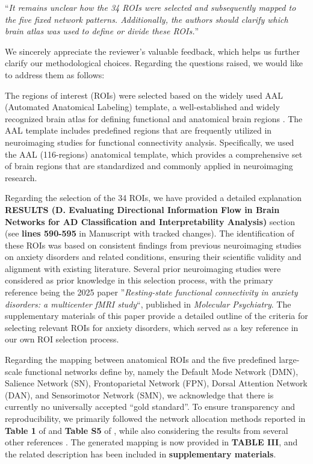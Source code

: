 \documentclass[lettersize,journal]{IEEEtran}
\begin{document}
 ``{\it It remains unclear how the 34 ROIs were selected and subsequently mapped to the five fixed network patterns. Additionally, the authors should clarify which brain atlas was used to define or divide these ROIs.}''
\vspace{1mm}


We sincerely appreciate the reviewer’s valuable feedback, which helps us further clarify our methodological choices. Regarding the questions raised, we would like to address them as follows:

The regions of interest (ROIs) were selected based on the widely used AAL (Automated Anatomical Labeling) template, a well-established and widely recognized brain atlas for defining functional and anatomical brain regions \cite{tzourio2002automated}. The AAL template includes predefined regions that are frequently utilized in neuroimaging studies for functional connectivity analysis. Specifically, we used the AAL (116-regions) anatomical template, which provides a comprehensive set of brain regions that are standardized and commonly applied in neuroimaging research.

Regarding the selection of the 34 ROIs, we have provided a detailed explanation \textbf{RESULTS (D. Evaluating Directional Information Flow in Brain Networks for AD Classification and Interpretability Analysis)} section (see \textbf{lines 590-595} in Manuscript with tracked changes). The identification of these ROIs was based on consistent findings from previous neuroimaging studies on anxiety disorders and related conditions, ensuring their scientific validity and alignment with existing literature. Several prior neuroimaging studies were considered as prior knowledge in this selection process, with the primary reference being the 2025 paper ”\textit{Resting-state functional connectivity in anxiety disorders: a multicenter fMRI study}“, published in \textit{Molecular Psychiatry}\cite{langhammer2025resting}. The supplementary materials of this paper provide a detailed outline of the criteria for selecting relevant ROIs for anxiety disorders, which served as a key reference in our own ROI selection process.

Regarding the mapping between anatomical ROIs and the five predefined large-scale functional networks define by\cite{yeo2011organization}, namely the Default Mode Network (DMN), Salience Network (SN), Frontoparietal Network (FPN), Dorsal Attention Network (DAN), and Sensorimotor Network (SMN), we acknowledge that there is currently no universally accepted “gold standard”. To ensure transparency and reproducibility, we primarily followed the network allocation methods reported in \textbf{Table 1} of \cite{takagi2018common} and \textbf{Table S5} of \cite{sun2024brain}, while also considering the results from several other references
\cite{huang2022mapping,kuang2020default,passow2015default,pedersini2020functional,dixon2018heterogeneity,vossel2014dorsal,chenji2016investigating}. The generated mapping is now provided in \textbf{TABLE III}, and the related description has been included in \textbf{supplementary materials}.
\end{document}
